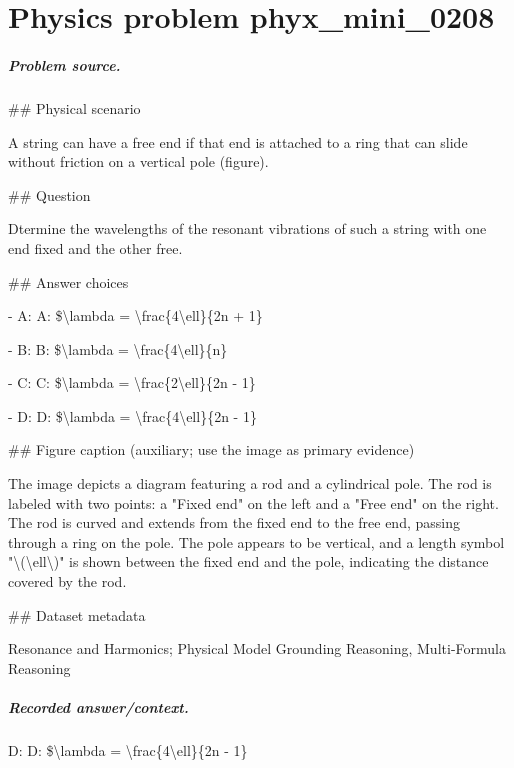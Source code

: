 
\chapter{Physics problem phyx\_mini\_0208}
\label{ch:PhyXMiniProblems_problem_phyx_mini_0208}

\paragraph{Problem source.}
\#\# Physical scenario

A string can have a free end if that end is attached to a ring that can slide without friction on a vertical pole (figure).

\#\# Question

Dtermine the wavelengths of the resonant vibrations of such a string with one end fixed and the other free.

\#\# Answer choices

- A: A: \$\textbackslash{}lambda = \textbackslash{}frac\{4\textbackslash{}ell\}\{2n + 1\}

- B: B: \$\textbackslash{}lambda = \textbackslash{}frac\{4\textbackslash{}ell\}\{n\}

- C: C: \$\textbackslash{}lambda = \textbackslash{}frac\{2\textbackslash{}ell\}\{2n - 1\}

- D: D: \$\textbackslash{}lambda = \textbackslash{}frac\{4\textbackslash{}ell\}\{2n - 1\}

\#\# Figure caption (auxiliary; use the image as primary evidence)

The image depicts a diagram featuring a rod and a cylindrical pole. The rod is labeled with two points: a "Fixed end" on the left and a "Free end" on the right. The rod is curved and extends from the fixed end to the free end, passing through a ring on the pole. The pole appears to be vertical, and a length symbol "\textbackslash{}(\textbackslash{}ell\textbackslash{})" is shown between the fixed end and the pole, indicating the distance covered by the rod.

\#\# Dataset metadata

Resonance and Harmonics; Physical Model Grounding Reasoning, Multi-Formula Reasoning

\paragraph{Recorded answer/context.}
D: D: \$\textbackslash{}lambda = \textbackslash{}frac\{4\textbackslash{}ell\}\{2n - 1\}

